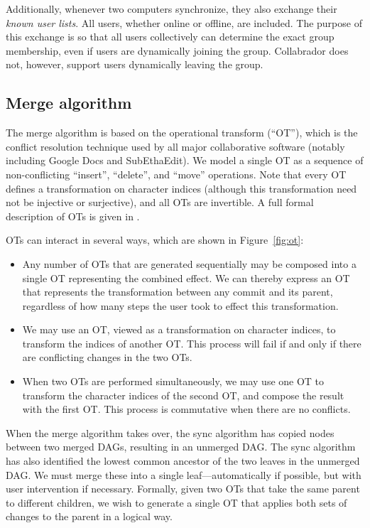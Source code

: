\documentclass[11pt,titlepage]{article}
\begin{document}
Additionally, whenever two computers synchronize, they also exchange
their \emph{known user lists}. All users, whether online or offline,
are included. The purpose of this exchange is so that all users
collectively can determine the exact group membership, even if users
are dynamically joining the group. Collabrador does not, however,
support users dynamically leaving the group.

\subsection{Merge algorithm}
\label{sec:merge}

The merge algorithm is based on the operational transform (``OT''),
which is the conflict resolution technique used by all major
collaborative software (notably including Google Docs and
SubEthaEdit).  We model a single OT as a sequence of non-conflicting
``insert'', ``delete'', and ``move'' operations.  Note that every OT
defines a transformation on character indices (although this
transformation need not be injective or surjective), and all OTs are
invertible.  A full formal description of OTs is given in \cite{wave}.

OTs can interact in several ways, which are shown in
Figure~\ref{fig:ot}:
\begin{itemize}
\item Any number of OTs that are generated sequentially may be
  composed into a single OT representing the combined effect.  We can
  thereby express an OT that represents the transformation between any
  commit and its parent, regardless of how many steps the user took to
  effect this transformation.
\item We may use an OT, viewed as a transformation on character
  indices, to transform the indices of another OT.  This process will
  fail if and only if there are conflicting changes in the two OTs.
\item When two OTs are performed simultaneously, we may use one OT to
  transform the character indices of the second OT, and compose the
  result with the first OT.  This process is commutative when there
  are no conflicts.
\end{itemize}

When the merge algorithm takes over, the sync algorithm has copied
nodes between two merged DAGs, resulting in an unmerged DAG.  The sync
algorithm has also identified the lowest common ancestor of the two
leaves in the unmerged DAG.  We must merge these into a single
leaf---automatically if possible, but with user intervention if
necessary. Formally, given two OTs that take the same parent to
different children, we wish to generate a single OT that applies both
sets of changes to the parent in a logical way.
\end{document}
